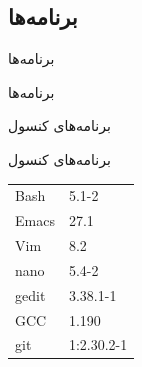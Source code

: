 \documentclass[hyperref={colorlinks}]{beamer}
\begin{document}

\begin{persian}
\section{برنامه‌ها}
\begin{frame}{برنامه‌ها}
\begin{block}{}
برنامه‌ها
\end{block}
\end{frame}
\end{persian}
\begin{persian}
\begin{frame}{برنامه‌های کنسول}
\begin{block}{برنامه‌های کنسول}
\begin{latin}
\begin{tabular}{ll} 
Bash & 5.1-2 \\
Emacs & 27.1 \\
Vim & 8.2  \\
nano & 5.4-2 \\
gedit &   3.38.1-1 \\
GCC &  1.190 \\
git & 1:2.30.2-1 \\
\end{tabular}
\end{latin}
\end{block}
\end{frame}
\end{persian}
\end{document}
